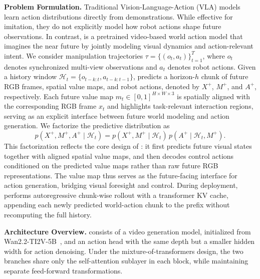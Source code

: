
\label{sec:overview}

\noindent\textbf{Problem Formulation.}
Traditional Vision-Language-Action (VLA) models~\cite{pi0,pi05,atomvla,llava-vla,openvla,rt2} learn action distributions directly from demonstrations. While effective for imitation, they do not explicitly model how robot actions shape future observations. In contrast, \method is a pretrained video-based world action model that imagines the near future by jointly modeling visual dynamics and action-relevant intent.
We consider manipulation trajectories $\tau=\{(o_t,a_t)\}_{t=1}^{T}$, where $o_t$ denotes synchronized multi-view observations and $a_t$ denotes robot actions. Given a history window $\mathcal{H}_t=\{o_{t-k:t}, a_{t-k:t-1}\}$, \method predicts a horizon-$h$ chunk of future RGB frames, spatial value maps, and robot actions, denoted by $X^+$, $M^+$, and $A^+$, respectively. Each future value map $m_t \in [0,1]^{H \times W \times 3}$ is spatially aligned with the corresponding RGB frame $x_t$ and highlights task-relevant interaction regions, serving as an explicit interface between future world modeling and action generation. We factorize the predictive distribution as
\begin{equation}
p(X^+, M^+, A^+ \mid \mathcal{H}_t)
=
p(X^+, M^+ \mid \mathcal{H}_t)\,
p(A^+ \mid \mathcal{H}_t, M^+).
\end{equation}
This factorization reflects the core design of \method: it first predicts future visual states together with aligned spatial value maps, and then decodes control actions conditioned on the predicted value maps rather than raw future RGB representations. The value map thus serves as the future-facing interface for action generation, bridging visual foresight and control. During deployment, \method performs autoregressive chunk-wise rollout with a transformer KV cache, appending each newly predicted world-action chunk to the prefix without recomputing the full history.

\noindent\textbf{Architecture Overview.}
\method consists of a video generation model, initialized from Wan2.2-TI2V-5B~\cite{wan2025wan}, and an action head with the same depth but a smaller hidden width for action denoising. Under the mixture-of-transformers design, the two branches share only the self-attention sublayer in each block, while maintaining separate feed-forward transformations.

